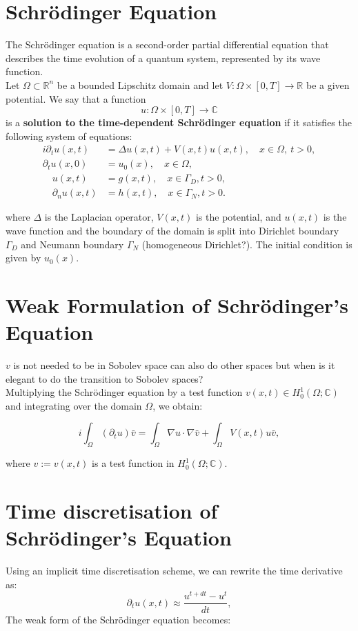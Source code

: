 \documentclass{article}
\theoremstyle{definition}
\theoremstyle{plain}
\theoremstyle{remark}
\begin{document}
\section{Schrödinger Equation}
The Schrödinger equation is a second-order partial differential equation that describes the time evolution of a quantum system, represented by its wave function. \\
Let $\Omega \subset \mathbb{R}^n$ be a bounded Lipschitz domain and let $V : \Omega \times [0,T] \to \mathbb{R}$ be a given potential. We say that a function
\[
u : \Omega \times [0,T] \to \mathbb{C}
\]
is a \textbf{solution to the time-dependent Schrödinger equation} if it satisfies the following system of equations:
\begin{align}
    i \partial_t u(x,t) &= \Delta u(x,t) + V(x,t) u(x,t), \quad x \in \Omega, \ t > 0,\\
    \partial_t u(x,0) &= u_0(x), \quad x \in \Omega,\\
    \quad u(x,t) &= g(x,t), \quad x \in \Gamma_D, t>0,\\
    \quad \partial_n u(x,t) &= h(x,t), \quad x \in \Gamma_N, t> 0.
\end{align}


where $\Delta$ is the Laplacian operator, $V(x,t)$ is the potential, and $u(x,t)$ is the wave function and the boundary of the domain is split into Dirichlet boundary $\Gamma_D$ and Neumann boundary $\Gamma_N$ (homogeneous Dirichlet?). 
The initial condition is given by $u_0(x)$.

\section{Weak Formulation of Schrödinger's Equation}
$v$ is not needed to be in Sobolev space can also do other spaces but when is it elegant to do the transition to Sobolev spaces? \\
Multiplying the Schrödinger equation by a test function $v(x,t) \in H_0^1(\Omega; \mathbb{C})$ and integrating over the domain $\Omega$, we obtain:

\begin{equation}
    i \int_{\Omega} \left( \partial_t u \right) \bar{v} = \int_{\Omega} \nabla u \cdot \nabla \bar{v} + \int_{\Omega} V(x,t) u \bar{v},
\end{equation}

where $v := v(x,t)$ is a test function in $H_0^1(\Omega; \mathbb{C})$.

\section{Time discretisation of Schrödinger's Equation}
Using an implicit time discretisation scheme, we can rewrite the time derivative as:
\begin{equation}
    \partial_t u(x,t) \approx \frac{u^{t + dt} - u^t}{dt},
\end{equation}
The weak form of the Schrödinger equation becomes:
\end{document}
